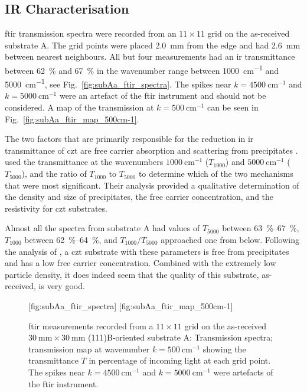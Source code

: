 \subsection{IR Characterisation}

\Ac{ftir} transmission spectra were recorded from an $11\times11$ grid on the as-received substrate A. The grid points were placed \SI{2.0}{\milli\metre} from the edge and had \SI{2.6}{\milli\metre} between nearest neighbours. All but four measurements had an \ac{ir} transmittance between \SI{62}{\percent} and \SI{67}{\percent} in the wavenumber range between \SI{1000}{\centi\metre^{-1}} and \SI{5000}{\centi\metre^{-1}}, see Fig.~\ref{fig:subAa_ftir_spectra}. The spikes near $k=\SI{4500}{\centi\metre^{-1}}$ and $k=\SI{5000}{\centi\metre^{-1}}$ were an artefact of the \ac{ftir} instrument and should not be considered. A map of the transmission at $k=\SI{500}{\centi\metre^{-1}}$ can be seen in Fig.~\ref{fig:subAa_ftir_map_500cm-1}.

The two factors that are primarily responsible for the reduction in \ac{ir} transmittance of \ac{czt} are free carrier absorption and scattering from precipitates \citep{yadava1994precipitation}. \citet{yujie2004infrared} used the transmittance at the wavenumbers $\SI{1000}{\centi\metre^{-1}}$ ($T_{1000}$) and $\SI{5000}{\centi\metre^{-1}}$ ($T_{5000}$), and the ratio of $T_{1000}$ to $T_{5000}$ to determine which of the two mechanisms that were most significant. Their analysis provided a qualitative determination of the density and size of  precipitates, the free carrier concentration, and the resistivity for \ac{czt} substrates. %

Almost all the spectra from substrate A had values of $T_{5000}$ between \SIrange{63}{67}{\percent}, $T_{1000}$ between \SIrange{62}{64}{\percent}, and $T_{1000}/T_{5000}$ approached one from below. Following the analysis of \citeauthor{yujie2004infrared}, a \ac{czt} substrate with these parameters is free from precipitates and has a low free carrier concentration. Combined with the extremely low particle density, it does indeed seem that the quality of this substrate, as-received, is very good. %

\begin{figure}[htbp]
    \centering
    [fig:subAa_ftir_spectra]
    \hfill
    [fig:subAa_ftir_map_500cm-1]
    \caption[\Ac{ftir} measurements of the as-received substrate A.]{\Ac{ftir} measurements recorded from a $11\times11$ grid on the as-received $\SI{30}{\milli\metre}\times\SI{30}{\milli\metre}$ (111)B-oriented substrate A:  Transmission spectra;  transmission map at wavenumber $k=\SI{500}{\centi\metre^{-1}}$ showing the transmittance $T$ in percentage of incoming light at each grid point. The spikes near $k=\SI{4500}{\centi\metre^{-1}}$ and $k=\SI{5000}{\centi\metre^{-1}}$ were artefacts of the \ac{ftir} instrument.}
\end{figure}

